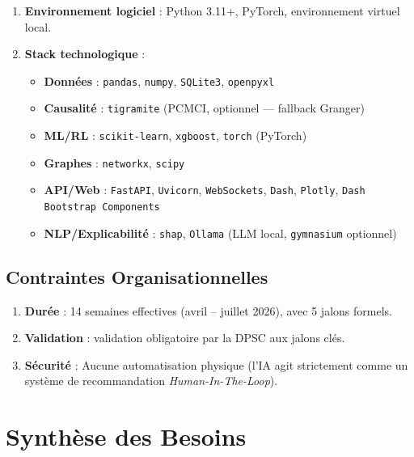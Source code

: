 \begin{enumerate}
  \item \textbf{Environnement logiciel} : Python 3.11+, PyTorch, environnement virtuel local.
  \item \textbf{Stack technologique} :
  \begin{itemize}
    \item \textbf{Données} : \texttt{pandas}, \texttt{numpy}, \texttt{SQLite3}, \texttt{openpyxl}
    \item \textbf{Causalité} : \texttt{tigramite} (PCMCI, optionnel — fallback Granger)
    \item \textbf{ML/RL} : \texttt{scikit-learn}, \texttt{xgboost}, \texttt{torch} (PyTorch)
    \item \textbf{Graphes} : \texttt{networkx}, \texttt{scipy}
    \item \textbf{API/Web} : \texttt{FastAPI}, \texttt{Uvicorn}, \texttt{WebSockets}, \texttt{Dash}, \texttt{Plotly}, \texttt{Dash Bootstrap Components}
    \item \textbf{NLP/Explicabilité} : \texttt{shap}, \texttt{Ollama} (LLM local, \texttt{gymnasium} optionnel)
  \end{itemize}
\end{enumerate}

\subsection{Contraintes Organisationnelles}
\label{subsec:contraintes_orga}

\begin{enumerate}
  \item \textbf{Durée} : 14 semaines effectives (avril – juillet 2026), avec 5 jalons formels.
  \item \textbf{Validation} : validation obligatoire par la DPSC aux jalons clés.
  \item \textbf{Sécurité} : Aucune automatisation physique (l'IA agit strictement comme un système de recommandation \textit{Human-In-The-Loop}).
\end{enumerate}

\section{Synthèse des Besoins}
\label{sec:synthese_besoins}

